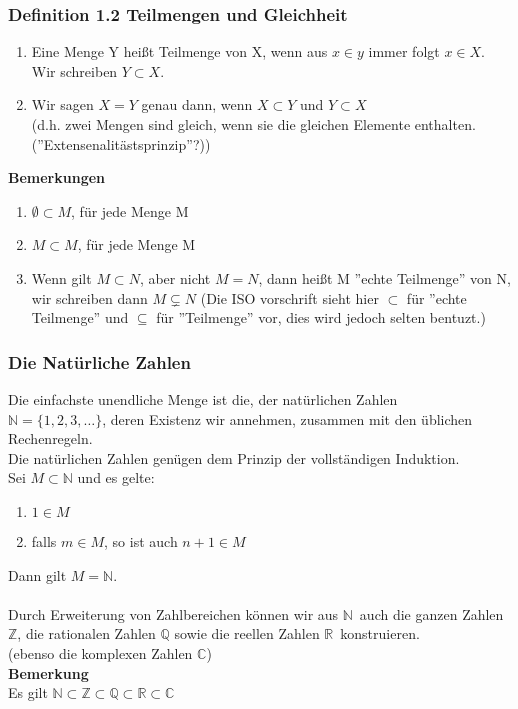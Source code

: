 \documentclass{article}
\newcommand{\N}{\mathbb{N}}
\newcommand{\mR}{$\mathbb{R}$\ }
\newcommand{\mN}{$\mathbb{N}$\ }
\begin{document}
\subsubsection{Definition 1.2 Teilmengen und Gleichheit}
\begin{enumerate}
\item{Eine Menge Y hei\ss{}t Teilmenge von X, wenn aus $x \in y$ immer folgt $x \in X$. Wir schreiben $Y \subset X$.}
\item{Wir sagen $X=Y$ genau dann, wenn $X \subset Y$ und $Y \subset X$\\
(d.h. zwei Mengen sind gleich, wenn sie die gleichen Elemente enthalten. (''Extensenalitästsprinzip''?))}
\end{enumerate}
\textbf{Bemerkungen}
\begin{enumerate}
\item{$\emptyset \subset M$, für jede Menge M}
\item{$M \subset M$, für jede Menge M}
\item{Wenn gilt $M \subset N$, aber nicht $M = N$, dann hei\ss{}t M ''echte Teilmenge'' von N, wir schreiben dann $M \subsetneq N$ (Die ISO vorschrift sieht hier $\subset$ für ''echte Teilmenge'' und $\subseteq$ für ''Teilmenge'' vor, dies wird jedoch selten bentuzt.)}
\end{enumerate}

\subsubsection{Die Natürliche Zahlen}
Die einfachste unendliche Menge ist die, der natürlichen Zahlen\\
$\N = \{1, 2, 3, \dots\}$, deren Existenz wir annehmen, zusammen mit den üblichen Rechenregeln.\\
Die natürlichen Zahlen genügen dem Prinzip der vollständigen Induktion.\\
Sei $M \subset \N$ und es gelte:
\begin{enumerate}
\item{$1 \in M$}
\item{falls $m \in M$, so ist auch $n + 1 \in M$}
\end{enumerate}
Dann gilt $M = \N$.\\
\\
Durch Erweiterung von Zahlbereichen können wir aus \mN auch die ganzen Zahlen $\mathbb{Z}$, die rationalen Zahlen $\mathbb{Q}$ sowie die reellen Zahlen \mR konstruieren.\\
(ebenso die komplexen Zahlen $\mathbb{C}$)\\
\textbf{Bemerkung}\\
Es gilt $\N \subset \mathbb{Z} \subset \mathbb{Q} \subset \mathbb{R} \subset \mathbb{C}$\\
\end{document}
